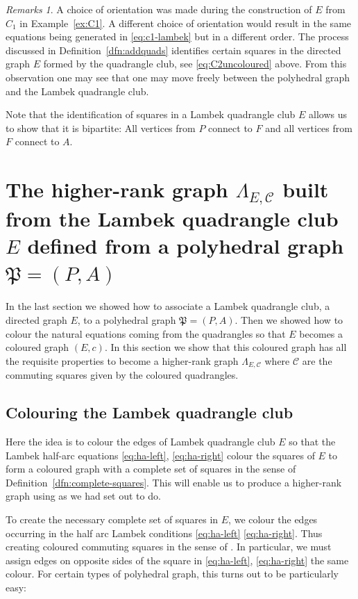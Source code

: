 \documentclass[12pt]{amsart}
\theoremstyle{definition}
\theoremstyle{remark}
\newtheorem{rmks}[thm]{Remarks}
\numberwithin{equation}{section}
\begin{document}
\begin{rmks} \label{rmk:Imfree}
A choice of orientation was made during the construction of $E$ from $C_1$ in Example~\ref{ex:C1}. A different choice of orientation would result in the same equations being generated in \eqref{eq:c1-lambek} but in a different order. The process discussed in Definition~\ref{dfn:addquads} identifies certain  squares in the directed graph $E$ formed by the quadrangle club, see \eqref{eq:C2uncoloured} above. From this observation one may see that one may move freely between the polyhedral graph and the Lambek quadrangle club.

Note that the identification of squares in a Lambek quadrangle club $E$ allows us to show that it is bipartite: All vertices from $P$ connect to $F$ and all vertices from $F$ connect to $A$.
\end{rmks}



\section{The higher-rank graph $\Lambda_{E,\mathcal{C}}$  built from the Lambek quadrangle club $E$ defined from a polyhedral graph $\mathfrak{P}=(P,A)$} \label{sec:three}

\noindent
In the last section we showed how to associate a Lambek quadrangle club, a directed graph $E$, to a polyhedral graph $\mathfrak{P}=(P,A)$. Then we showed how to colour the natural equations coming from the quadrangles so that $E$ becomes a coloured graph $(E,c)$. In this section we show that this coloured graph has all the requisite properties to become a higher-rank graph $\Lambda_{E,\mathcal{C}}$ where $\mathcal{C}$ are the commuting squares given by the coloured quadrangles.

\subsection{Colouring the Lambek quadrangle club} \label{sec:threepointone}

Here the idea is to colour the edges of Lambek quadrangle club $E$ so that the Lambek half-arc equations \eqref{eq:ha-left}, \eqref{eq:ha-right} colour the squares of $E$ to form a coloured graph with a complete set of squares in the sense of Definition~\ref{dfn:complete-squares}. This will enable us to produce a higher-rank graph using \cite{hrsw} as we had set out to do. 

To  create the necessary complete set of squares in $E$, we colour the edges occurring in the half arc Lambek conditions \eqref{eq:ha-left}  \eqref{eq:ha-right}. Thus creating coloured commuting squares in the sense of \cite{hrsw}. In particular, we must assign edges on opposite sides of the square in \eqref{eq:ha-left}, \eqref{eq:ha-right} the same colour. For certain types of polyhedral graph, this turns out to be particularly easy:
\end{document}
